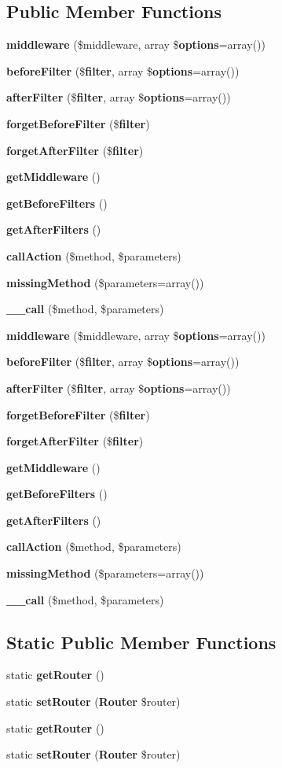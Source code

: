 \subsection*{Public Member Functions}
\begin{DoxyCompactItemize}
\item 
{\bf middleware} (\$middleware, array \${\bf options}=array())
\item 
{\bf before\+Filter} (\${\bf filter}, array \${\bf options}=array())
\item 
{\bf after\+Filter} (\${\bf filter}, array \${\bf options}=array())
\item 
{\bf forget\+Before\+Filter} (\${\bf filter})
\item 
{\bf forget\+After\+Filter} (\${\bf filter})
\item 
{\bf get\+Middleware} ()
\item 
{\bf get\+Before\+Filters} ()
\item 
{\bf get\+After\+Filters} ()
\item 
{\bf call\+Action} (\$method, \$parameters)
\item 
{\bf missing\+Method} (\$parameters=array())
\item 
{\bf \+\_\+\+\_\+call} (\$method, \$parameters)
\item 
{\bf middleware} (\$middleware, array \${\bf options}=array())
\item 
{\bf before\+Filter} (\${\bf filter}, array \${\bf options}=array())
\item 
{\bf after\+Filter} (\${\bf filter}, array \${\bf options}=array())
\item 
{\bf forget\+Before\+Filter} (\${\bf filter})
\item 
{\bf forget\+After\+Filter} (\${\bf filter})
\item 
{\bf get\+Middleware} ()
\item 
{\bf get\+Before\+Filters} ()
\item 
{\bf get\+After\+Filters} ()
\item 
{\bf call\+Action} (\$method, \$parameters)
\item 
{\bf missing\+Method} (\$parameters=array())
\item 
{\bf \+\_\+\+\_\+call} (\$method, \$parameters)
\end{DoxyCompactItemize}
\subsection*{Static Public Member Functions}
\begin{DoxyCompactItemize}
\item 
static {\bf get\+Router} ()
\item 
static {\bf set\+Router} ({\bf Router} \$router)
\item 
static {\bf get\+Router} ()
\item 
static {\bf set\+Router} ({\bf Router} \$router)
\end{DoxyCompactItemize}
